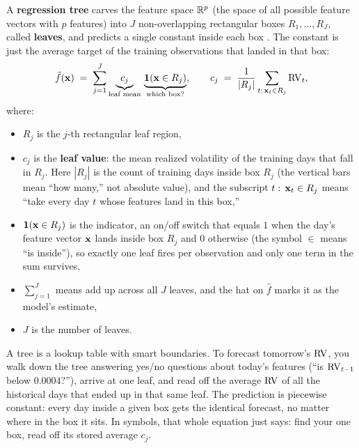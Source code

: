 A \textbf{regression tree} carves the feature space $\mathbb{R}^p$ (the space of all
possible feature vectors with $p$ features) into $J$
non-overlapping rectangular boxes $R_1, \ldots, R_J$, called \textbf{leaves},
and predicts a single constant inside each box \citep{Breiman1984}.  The
constant is just the average target of the training observations that landed
in that box:
\begin{equation}\label{eq:trees:cart_pred}
  \hat{f}(\mathbf{x}) \;=\; \sum_{j=1}^{J}
  \underbrace{c_j}_{\text{leaf mean}}\,
  \underbrace{\mathbf{1}(\mathbf{x} \in R_j)}_{\text{which box?}},
  \qquad
  c_j \;=\; \frac{1}{|R_j|}\sum_{t:\,\mathbf{x}_t \in R_j} \operatorname{RV}_t,
\end{equation}
where:
\begin{itemize}[leftmargin=1.8em]
  \item $R_j$ is the $j$-th rectangular leaf region,
  \item $c_j$ is the \textbf{leaf value}: the mean realized volatility of
        the training days that fall in $R_j$.  Here $|R_j|$ is the count of
        training days inside box $R_j$ (the vertical bars mean ``how many,''
        not absolute value), and the subscript $t:\,\mathbf{x}_t \in R_j$ means
        ``take every day $t$ whose features land in this box,''
  \item $\mathbf{1}(\mathbf{x} \in R_j)$ is the indicator, an on/off switch that
        equals $1$ when the day's feature vector $\mathbf{x}$ lands inside box $R_j$
        and $0$ otherwise (the symbol $\in$ means ``is inside''), so exactly
        one leaf fires per observation and only one term in the sum survives,
  \item $\sum_{j=1}^{J}$ means add up across all $J$ leaves, and the hat on
        $\hat{f}$ marks it as the model's estimate,
  \item $J$ is the number of leaves.
\end{itemize}

\begin{intuition}
A tree is a lookup table with smart boundaries.  To forecast tomorrow's
$\operatorname{RV}$, you walk down the tree answering yes/no questions about today's
features (``is $\operatorname{RV}_{t-1}$ below $0.0004$?''), arrive at one leaf, and read
off the average $\operatorname{RV}$ of all the historical days that ended up in that same
leaf.  The prediction is piecewise constant: every day inside a given box
gets the identical forecast, no matter where in the box it sits.  In symbols,
that whole equation just says: find your one box, read off its stored
average $c_j$.
\end{intuition}

